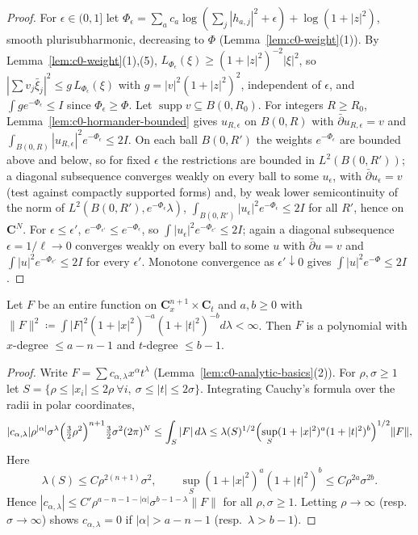 \begin{proof}
For $\epsilon\in(0,1]$ let $\Phi_\epsilon=\sum_ac_a\log(\sum_j|h_{a,j}|^2+\epsilon)+\log(1+|z|^2)$, smooth plurisubharmonic, decreasing to $\Phi$
(Lemma~\ref{lem:c0-weight}(1)). By Lemma~\ref{lem:c0-weight}(1),(5), $L_{\Phi_\epsilon}(\xi)\ge(1+|z|^2)^{-2}|\xi|^2$, so
$|\sum v_j\bar\xi_j|^2\le g\,L_{\Phi_\epsilon}(\xi)$ with $g=|v|^2(1+|z|^2)^2$, independent of $\epsilon$, and $\int ge^{-\Phi_\epsilon}\le I$ since
$\Phi_\epsilon\ge\Phi$. Let $\operatorname{supp}v\subseteq B(0,R_0)$. For integers $R\ge R_0$, Lemma~\ref{lem:c0-hormander-bounded} gives $u_{R,\epsilon}$ on $B(0,R)$
with $\bar\partial u_{R,\epsilon}=v$ and $\int_{B(0,R)}|u_{R,\epsilon}|^2e^{-\Phi_\epsilon}\le2I$. On each ball $B(0,R')$ the weights $e^{-\Phi_\epsilon}$ are bounded
above and below, so for fixed $\epsilon$ the restrictions are bounded in $L^2(B(0,R'))$; a diagonal subsequence converges weakly on every
ball to some $u_\epsilon$, with $\bar\partial u_\epsilon=v$ (test against compactly supported forms) and, by weak lower semicontinuity of the norm of
$L^2(B(0,R'),e^{-\Phi_\epsilon}\lambda)$, $\int_{B(0,R')}|u_\epsilon|^2e^{-\Phi_\epsilon}\le2I$ for all $R'$, hence on $\mathbf C^N$. For $\epsilon\le\epsilon'$,
$e^{-\Phi_{\epsilon'}}\le e^{-\Phi_\epsilon}$, so $\int|u_\epsilon|^2e^{-\Phi_{\epsilon'}}\le2I$; again a diagonal subsequence $\epsilon=1/\ell\to0$ converges weakly on every ball to
some $u$ with $\bar\partial u=v$ and $\int|u|^2e^{-\Phi_{\epsilon'}}\le2I$ for every $\epsilon'$. Monotone convergence as $\epsilon'\downarrow0$ gives
$\int|u|^2e^{-\Phi}\le2I$.
\end{proof}

\begin{lemma}\label{lem:c0-polynomial-growth}
\leanok
{}
Let $F$ be an entire function on $\mathbf C^{n+1}_x\times\mathbf C_t$ and $a,b\ge0$ with
$\|F\|^2\coloneqq\int|F|^2(1+|x|^2)^{-a}(1+|t|^2)^{-b}d\lambda<\infty$. Then $F$ is a polynomial with $x$-degree $\le a-n-1$ and $t$-degree
$\le b-1$.
\end{lemma}

\begin{proof}
Write $F=\sum c_{\alpha,\lambda}x^\alpha t^\lambda$ (Lemma~\ref{lem:c0-analytic-basics}(2)). For $\rho,\sigma\ge1$ let
$S=\{\rho\le|x_i|\le2\rho\ \forall i,\ \sigma\le|t|\le2\sigma\}$. Integrating Cauchy's formula over the radii in polar coordinates,
\[
|c_{\alpha,\lambda}|\rho^{|\alpha|}\sigma^\lambda\Bigl(\tfrac32\rho^2\Bigr)^{n+1}\tfrac32\sigma^2(2\pi)^N\le\int_S|F|\,d\lambda\le
\lambda(S)^{1/2}\Bigl(\sup_S(1+|x|^2)^a(1+|t|^2)^b\Bigr)^{1/2}\|F\|,
\]
Here
\[
 \lambda(S)\le C\rho^{2(n+1)}\sigma^2,\qquad
 \sup_S(1+|x|^2)^a(1+|t|^2)^b\le C\rho^{2a}\sigma^{2b}.
\]
Hence
$|c_{\alpha,\lambda}|\le C'\rho^{a-n-1-|\alpha|}\sigma^{b-1-\lambda}\|F\|$ for all $\rho,\sigma\ge1$. Letting $\rho\to\infty$ (resp.\ $\sigma\to\infty$) shows
$c_{\alpha,\lambda}=0$ if $|\alpha|>a-n-1$ (resp.\ $\lambda>b-1$).
\end{proof}

